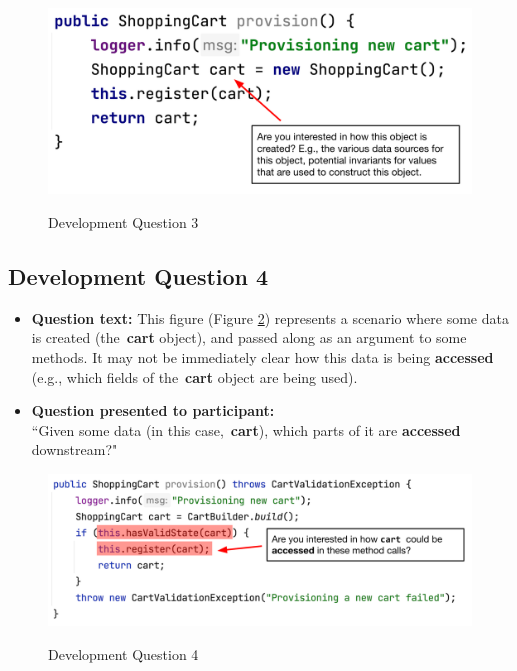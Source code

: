 \begin{figure}[ht]
\centering
\caption{Development Question 3}
\includegraphics[width=\textwidth]{./figs/ds3.png}
\label{fig:DS3}
\end{figure}

\subsection{Development Question 4}

\begin{itemize}
  \item[] \textbf{Question text:} This figure (Figure \ref{fig:DS4}) represents 
          a scenario where some data is created (the \textbf{cart} object), and
          passed along as an argument to some methods. It may not be 
          immediately clear how this data is being \textbf{accessed} (e.g., 
          which fields of the \textbf{cart} object are being used).
  \item[] \textbf{Question presented to participant:}  \\
          ``Given some data (in this case, \textbf{cart}), which parts of it
          are \textbf{accessed} downstream?"
\end{itemize}

\begin{figure}[ht]
\centering
\caption{Development Question 4}
\includegraphics[width=\textwidth]{./figs/ds4.png}
\label{fig:DS4}
\end{figure}

